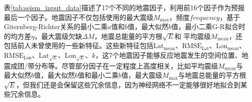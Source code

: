 表\ref{tab:seism_input_data}描述了17个不同的地震因子，利用前16个因子作为预报最后一个因子。地震因子不仅包括\citet{Panakkat2007Neural}使用的最大震级$M_{\max}$，频度$frequency$，基于 Giternberg-Richter关系的最小二乘$a$值和$b$值，最大似然$b$值，最小二乘G-R拟合时的均方差$\eta$，最大震级欠缺$\Delta M$，地震总能量的平方根$\sqrt{E}$和 平均震级$M_{\mathrm{mean}}$，还包括前人未曾使用的一些新特征。这些新特征包括$\mathrm{Lat}_{\mathrm{mean}}$、$\mathrm{RMSE}_{\mathrm{Lat}}$、$\mathrm{Lon}_{\mathrm{mean}}$、$\mathrm{RMSE}_{\mathrm{Lon}}$、$\mathrm{Lat}_{\sqrt{E}}$、$\mathrm{Lon}_{\sqrt{E}}$、$k$，这7个地震因子能够反应地震发生的空间位置、地震成团/带分布等。尽管部分因子在一定程度上高度相关，比如平均震级$M_{\mathrm{mean}}$与最大似然$b$值，最大似然$b$值和最小二乘$b$值，最大震级$M_{\max}$与地震总能量的平方根$\sqrt{E}$，但我们还是会保留这些冗余信息，因为神经网络不一定能够很好地拟合到某些冗余信息。


